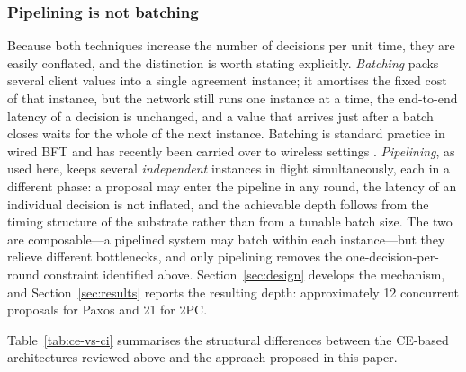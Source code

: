 \documentclass[journal]{IEEEtran}
\newcommand{\CE}{CE}                      %
\begin{document}
\subsubsection{Pipelining is not batching}
Because both techniques increase the number of decisions per unit time,
they are easily conflated, and the distinction is worth stating
explicitly. \emph{Batching} packs several client values into a single
agreement instance; it amortises the fixed cost of that instance, but the
network still runs one instance at a time, the end-to-end latency of a
decision is unchanged, and a value that arrives just after a batch closes
waits for the whole of the next instance. Batching is standard practice in
wired BFT and has recently been carried over to wireless settings
\cite{liu25partiallysync}. \emph{Pipelining}, as used here, keeps several
\emph{independent} instances in flight simultaneously, each in a different
phase: a proposal may enter the pipeline in any round, the latency of an
individual decision is not inflated, and the achievable depth follows from
the timing structure of the substrate rather than from a tunable batch
size. The two are composable---a pipelined system may batch within each
instance---but they relieve different bottlenecks, and only pipelining
removes the one-decision-per-round constraint identified above.
Section~\ref{sec:design} develops the mechanism, and
Section~\ref{sec:results} reports the resulting depth: approximately 12
concurrent proposals for Paxos and 21 for 2PC.

Table~\ref{tab:ce-vs-ci} summarises the structural differences between the
\CE-based architectures reviewed above and the approach proposed in this
paper.
\end{document}
